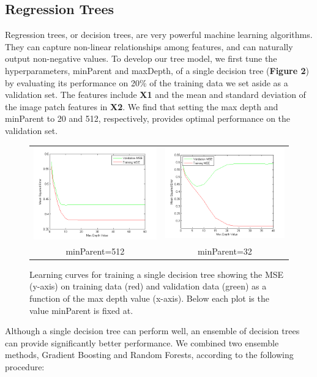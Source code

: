 \documentclass[12pt] {article}
\renewcommand{\baselinestretch}{1.3} %
\begin{document}
\subsection{Regression Trees}
Regression trees, or decision trees, are very powerful machine learning algorithms. They can capture non-linear relationships among features, and can naturally output non-negative values. To develop our tree model, we first tune the hyperparameters, minParent and maxDepth, of a single decision tree (\textbf{Figure 2}) by evaluating its performance on 20\% of the training data we set aside as a validation set. The features include \textbf{X1} and the mean and standard deviation of the image patch features in \textbf{X2}. We find that setting the max depth and minParent to 20 and 512, respectively, provides optimal performance on the validation set.
\renewcommand{\baselinestretch}{1.0} %
\begin{figure}[h!] \centering
\begin{tabular}{cc}
\includegraphics[width=.45\textwidth]{figdir/maxDepthVersusMSE.png} &
\includegraphics[width=.45\textwidth]{figdir/maxDepthVersusMSE2.png} \\
minParent=512 & minParent=32 \\
\end{tabular}
\caption{Learning curves for training a single decision tree showing the MSE (y-axis) on training data (red) and validation data (green) as a function of the max depth value (x-axis). Below each plot is the value minParent is fixed at.}
\end{figure}
\renewcommand{\baselinestretch}{1.3} %
Although a single decision tree can perform well, an ensemble of decision trees can provide significantly better performance. We combined two ensemble methods, Gradient Boosting and Random Forests, according to the following procedure:
\end{document}

